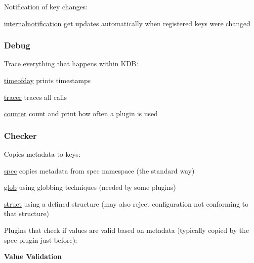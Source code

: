 Notification of key changes\+:


\begin{DoxyItemize}
\item \hyperlink{md_src_plugins_internalnotification_README_src_plugins_internalnotification_README_md}{internalnotification} get updates automatically when registered keys were changed
\end{DoxyItemize}

\subsubsection*{Debug}

Trace everything that happens within K\+DB\+:


\begin{DoxyItemize}
\item \hyperlink{md_src_plugins_timeofday_README_src_plugins_timeofday_README_md}{timeofday} prints timestamps
\item \hyperlink{md_src_plugins_tracer_README_src_plugins_tracer_README_md}{tracer} traces all calls
\item \hyperlink{md_src_plugins_counter_README_src_plugins_counter_README_md}{counter} count and print how often a plugin is used
\end{DoxyItemize}

\subsubsection*{Checker}

Copies metadata to keys\+:


\begin{DoxyItemize}
\item \hyperlink{md_src_plugins_spec_README_src_plugins_spec_README_md}{spec} copies metadata from spec namespace (the standard way)
\item \hyperlink{md_src_plugins_glob_README_src_plugins_glob_README_md}{glob} using globbing techniques (needed by some plugins)
\item \hyperlink{md_src_plugins_struct_README_src_plugins_struct_README_md}{struct} using a defined structure (may also reject configuration not conforming to that structure)
\end{DoxyItemize}

Plugins that check if values are valid based on metadata (typically copied by the {\ttfamily spec} plugin just before)\+:

{\bfseries Value Validation}


